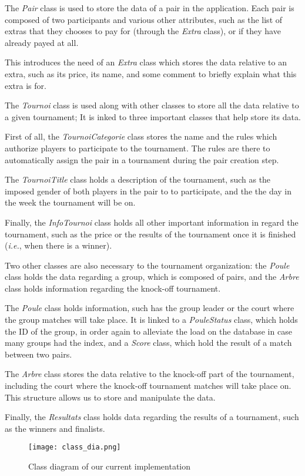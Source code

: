 The \textit{Pair} class is used to store the data of a pair in the application.
Each pair is composed of two participants and various other attributes, such
as the list of extras that they chooses to pay for (through the
\textit{Extra} class), or if they have already payed at all. \newline

This introduces the need of an \textit{Extra} class which stores the data
relative to an extra, such as its price, its name, and some comment to
briefly explain what this extra is for.\newline

The \textit{Tournoi} class is used along with other classes to store all the
data relative to a given tournament; It is inked to three important classes
that help store its data. \newline

First of all, the \textit{TournoiCategorie} class stores the name and the rules
which authorize players to participate to the tournament. The rules are there
to automatically assign the pair in a tournament during the pair creation step. \newline

The \textit{TournoiTitle} class holds a description of the tournament, such
as the imposed gender of both players in the pair to to participate, and the
the day in the week the tournament will be on. \newline

Finally, the \textit{InfoTournoi} class holds all other important information
in regard the tournament, such as the price or the results of the tournament
once it is finished (\textit{i.e.}, when there is a winner).

Two other classes are also necessary to the tournament organization:
the \textit{Poule} class holds the data regarding a group, which is composed of
pairs, and the \textit{Arbre} class holds information regarding the knock-off
tournament.\newline

The \textit{Poule} class holds information, such has the group leader or
the court where the group matches will take place. It is linked to a
\textit{PouleStatus} class, which holds the ID of the group, in order again
to alleviate the load on the database in case many groups had the index,
and a \textit{Score} class, which hold the result of a match between two pairs.\newline

The \textit{Arbre} class stores the data relative to the knock-off part
of the tournament, including the court where the knock-off tournament matches
will take place on. This structure allows us to store and manipulate the data.\newline

Finally, the \textit{Resultats} class holds data regarding the results of a
tournament, such as the winners and finalists. \newline

\begin{figure}[!ht]
	\centering
	\texttt{[image: class\_dia.png]}
	\caption{Class diagram of our current implementation}
	\label{fig:length_eight_mouse}
\end{figure}
\FloatBarrier
